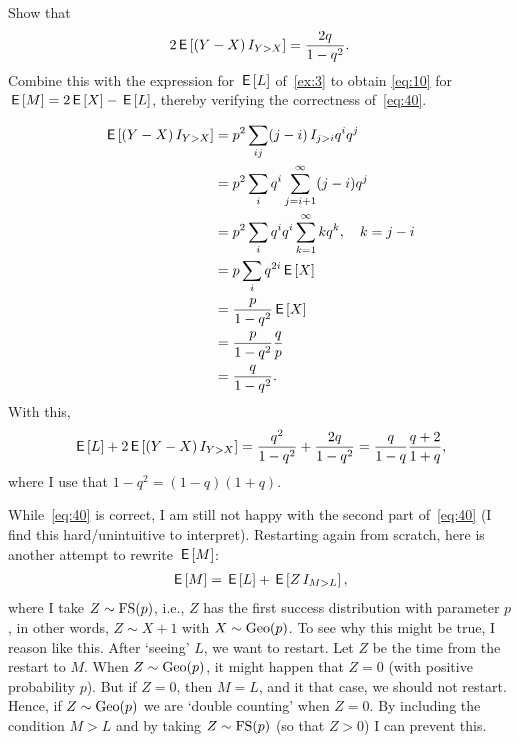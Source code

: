 \documentclass[a4paper,12pt]{article}
\begin{document}
\begin{exercise}\label{ex:9}
Show that 
\begin{equation}
  \label{eq:41}
2\,\mathsf{E}\left[(Y-X) \,I_{Y>X}\right] = \frac{2q} {1-q^{2}}.
\end{equation}
Combine this with the expression for $\,\mathsf{E}\left[L\right]$ of~\cref{ex:3} to obtain \cref{eq:10} for $\,\mathsf{E}\left[M\right] = 2\,\mathsf{E}\left[X\right] - \,\mathsf{E}\left[L\right]$, thereby verifying the correctness of~\cref{eq:40}. 
\begin{solution}
  \begin{align}
    \label{eq:42}
\,\mathsf{E}\left[(Y-X) \,I_{Y>X}\right] 
&= p^2\sum_{ij} (j-i)\,I_{j>i} q^iq^j\\
&= p^2\sum_{i} q^i\sum_{j=i+1}^{\infty}(j-i)q^j\\
&= p^2\sum_{i} q^i q^{i}\sum_{k=1}^{\infty}kq^k, \quad k = j-i\\
&= p\sum_{i}  q^{2i}\,\mathsf{E}\left[X\right] \\
&= \frac{p}{1-q^{2}}\,\mathsf{E}\left[X\right] \\
&= \frac{p}{1-q^{2}}\frac q p \\
&= \frac{q}{1-q^{2}}.
  \end{align}
With this, 
\begin{align}
  \label{eq:43}
\,\mathsf{E}\left[L\right] + 2  \,\mathsf{E}\left[(Y-X) \,I_{Y>X}\right] = \frac{q^{2}}{1-q^2} +  \frac{2q}{1-q^{2}} = \frac q{1-q}\frac{q+2}{1+q},
\end{align}
where I use that $1-q^{2}=(1-q)(1+q)$.
\end{solution}
\end{exercise}

While~\cref{eq:40} is correct, I am still not happy with the second part of~\eqref{eq:40} (I find this hard/unintuitive to interpret).
Restarting again from scratch, here is another attempt to rewrite $\,\mathsf{E}\left[M\right]$: 
\begin{align}
  \label{eq:44}
\,\mathsf{E}\left[M\right] = \,\mathsf{E}\left[L\right] + \,\mathsf{E}\left[ Z \,I_{M>L}\right],
\end{align}
where I take $Z\sim \mathrm{FS}(p)$, i.e., $Z$ has the first success distribution with parameter $p$, in other words, $Z \sim X+1$ with $X\sim\mathrm{Geo}(p)$.
To see why this might be true, I reason like this.
After `seeing' $L$, we want to restart.
Let $Z$ be the time from the restart to $M$.
When $Z\sim \mathrm{Geo}(p)$, it might happen that $Z=0$ (with positive probability $p$).
But if $Z=0$, then $M=L$, and it that case, we should not restart.
Hence, if $Z\sim \mathrm{Geo}(p)$ we are `double counting' when $Z=0$.
By including the condition $M>L$ and by taking $Z\sim\mathrm{FS}(p)$ (so that $Z>0$) I can prevent this.
\end{document}
